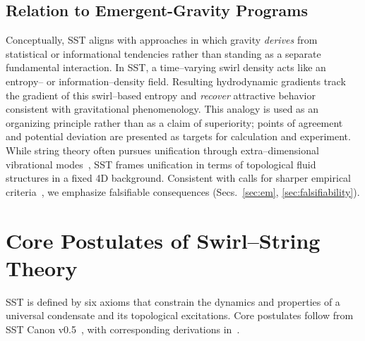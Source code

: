 \documentclass[10pt,reprint,aps,onecolumn,nofootinbib]{revtex4-2}
\begin{document}
    \subsection*{Relation to Emergent-Gravity Programs}
        Conceptually, SST aligns with approaches in which gravity \emph{derives} from statistical or informational tendencies rather than standing as a separate fundamental interaction. In SST, a time–varying swirl density acts like an entropy– or information–density field. Resulting hydrodynamic gradients track the gradient of this swirl–based entropy and \emph{recover} attractive behavior consistent with gravitational phenomenology. This analogy is used as an organizing principle rather than as a claim of superiority; points of agreement and potential deviation are presented as targets for calculation and experiment. While string theory often pursues unification through extra–dimensional vibrational modes~\cite{Susskind2003}, SST frames unification in terms of topological fluid structures in a fixed 4D background. Consistent with calls for sharper empirical criteria~\cite{Hossenfelder2018}, we emphasize falsifiable consequences (Secs.~\ref{sec:em}, \ref{sec:falsifiability}).


\section{Core Postulates of Swirl–String Theory}\label{sec:postulates}
    SST is defined by six axioms that constrain the dynamics and properties of a universal condensate and its topological excitations. Core postulates follow from SST Canon v0.5~\cite{sstCanon}, with corresponding derivations in~\cite{sstLagrangian}.
\end{document}
